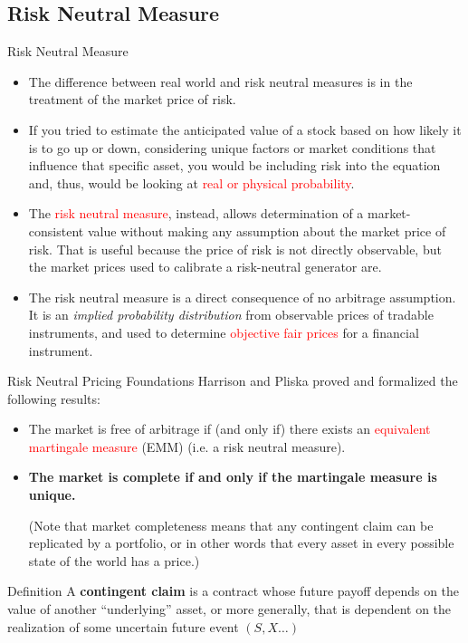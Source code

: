 \documentclass{beamer}
\begin{document}
\subsection{Risk Neutral Measure}
\begin{frame}{Risk Neutral Measure}
\begin{itemize}
\item  The difference between real world and risk neutral measures is in the treatment of the market price of risk.
\item If you tried to estimate the anticipated value of a stock based on how likely it is to go up or down, considering unique factors or market conditions that influence that specific asset, you would be including risk into the equation and, thus, would be looking at \textcolor{red}{real or physical probability}.
\item The \textcolor{red}{risk neutral measure}, instead, allows determination of a market-consistent value without making any assumption about the market price of risk. That is useful because the price of risk is not directly observable, but the market prices used to calibrate a risk-neutral generator are.
\item The risk neutral measure is a direct consequence of no arbitrage assumption. It is an \emph{implied probability distribution} from observable prices of tradable instruments, and used to determine \textcolor{red}{objective fair prices} for a financial instrument.
\end{itemize}
\end{frame}

\begin{frame}{Risk Neutral Pricing Foundations}
	Harrison and Pliska proved and formalized the following results:
	\begin{itemize}
		\item The market is free of arbitrage if (and only if) there exists an \textcolor{red}{equivalent martingale measure} (EMM) (i.e. a risk neutral measure).
		\item \textbf{The market is complete if and only if the martingale measure is unique.}
		
		(Note that market completeness means that any contingent claim can be replicated by a portfolio, or in other words that every asset in every possible state of the world has a price.)
	\end{itemize}
    \begin{block}{Definition}
		A \textbf{contingent claim} is a contract whose future payoff depends on the value of another “underlying” asset, or more generally, that is dependent on the realization of some uncertain future event $(S, X\ldots)$		    
	\end{block}
    \vfill
\end{frame}
\end{document}
